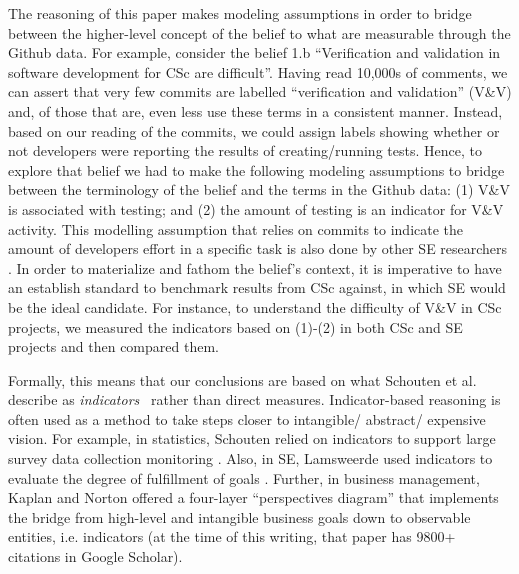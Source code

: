 \documentclass[conference,10pt]{IEEEtran}
\begin{document}
The reasoning of this 
paper makes
modeling assumptions in order to bridge between the higher-level concept of the belief to what are measurable through the Github data. For example, consider the belief 1.b ``Verification and validation in software development for CSc are difficult''.  
Having read 10,000s of comments, we can assert that 
very few commits are labelled  ``verification and validation'' (V\&V) and, of those that are,
even less use these terms in a consistent manner. Instead, based on our reading of the commits, we could assign labels showing whether or not developers were reporting the results of creating/running tests. Hence, to explore that belief we had to make the following modeling assumptions to bridge between the terminology of the belief and the terms in the Github data: (1) V\&V is associated with testing; and (2) the amount of testing is an indicator for V\&V activity. This modelling assumption that relies on commits to indicate the amount of developers effort in a specific  task is also done by other SE researchers \cite{vasilescu16_limit, xia2019sequential}. In order to materialize and fathom the belief's context, it is imperative to have an establish standard  to benchmark results from CSc against, in which SE would be the ideal candidate. For instance, to understand the difficulty of V\&V in CSc projects, we measured the indicators based on (1)-(2) in both CSc and SE projects and then compared them. 


Formally, this means that our conclusions are based on what
Schouten et al. describe as
 {\em indicators}~\cite{schouten2010indicators} rather than direct measures. Indicator-based reasoning is often used as a method to take steps closer to intangible/ abstract/ expensive vision. For example,
 in statistics, Schouten relied on indicators to support large survey data collection monitoring \cite{schouten2010indicators}. Also, in SE, Lamsweerde used indicators to evaluate the degree of fulfillment of goals \cite{vanLamsweerde2009_requirement}.
 Further, in business 
 management, Kaplan and Norton \cite{kaplan1996using} offered a four-layer ``perspectives diagram'' that implements the bridge from high-level and intangible business goals down
 to observable entities, i.e. indicators (at the time of this
 writing, that paper has  9800+ citations in Google Scholar).
   

\end{document}
